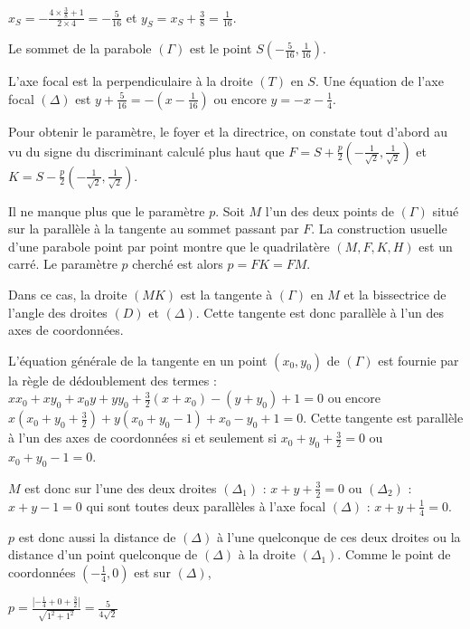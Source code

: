 {\begin{enumerate}
{\begin{center}
$x_S=-\frac{4\times\frac{3}{8}+1}{2\times4}= -\frac{5}{16}$  et $y_S =x_S+\frac{3}{8}=\frac{1}{16}$.
\end{center}

Le sommet de la parabole $(\Gamma)$ est le point $S\left(-\frac{5}{16},\frac{1}{16}\right)$.

L'axe focal est la perpendiculaire à la droite $(T)$ en $S$. Une équation de l'axe focal $(\Delta)$ est $y+\frac{5}{16}=-\left(x-\frac{1}{16}\right)$ ou encore $y = -x-\frac{1}{4}$.

Pour obtenir le paramètre, le foyer et la directrice, on constate tout d'abord au vu du signe du discriminant calculé plus haut que $F = S+\frac{p}{2}\left(-\frac{1}{\sqrt{2}},\frac{1}{\sqrt{2}}\right)$    et $K= S-\frac{p}{2}\left(-\frac{1}{\sqrt{2}},\frac{1}{\sqrt{2}}\right)$.

Il ne manque plus que le paramètre $p$. Soit $M$ l'un des deux points de $(\Gamma)$ situé sur la parallèle à la tangente au sommet passant par $F$. La construction usuelle d'une parabole point par point montre que le quadrilatère $(M,F,K,H)$ est un carré. Le paramètre $p$ cherché est alors $p=FK=FM$.

 
Dans ce cas, la droite $(MK)$ est la tangente à $(\Gamma)$ en $M$ et la bissectrice de l'angle des droites $(D)$ et $(\Delta)$. Cette tangente est donc parallèle à l'un des axes de coordonnées.

L'équation générale de la tangente en un point $(x_0,y_0)$ de $(\Gamma)$ est fournie par la règle de dédoublement des termes : $xx_0+xy_0+x_0y+yy_0+\frac{3}{2}(x+ x_0)-(y+y_0)+1=0$ ou encore $x\left(x_0+y_0+\frac{3}{2}\right)+y(x_0+y_0-1)+ x_0-y_0+1=0$. Cette tangente est parallèle à l'un des axes de coordonnées si et seulement si $x_0+y_0+\frac{3}{2}=0$ ou $x_0+y_0-1=0$.

$M$ est donc sur l'une des deux droites $(\Delta_1)$ : $x+y+\frac{3}{2}=0$ ou $(\Delta_2)$ : $x+y-1=0$ qui sont toutes deux parallèles à l'axe focal $(\Delta)$ : $x+y+\frac{1}{4}=0$.

$p$ est donc aussi la distance de $(\Delta)$ à l'une quelconque de ces deux droites ou la distance d'un point quelconque de $(\Delta)$ à la droite $(\Delta_1)$. Comme le point de coordonnées $\left(-\frac{1}{4},0\right)$ est sur $(\Delta)$,

\begin{center}
$p=\frac{\left|-\frac{1}{4}+0+\frac{3}{2}\right|}{\sqrt{1^2+1^2}}=\frac{5}{4\sqrt{2}}$
\end{center}

}
\end{enumerate}}
